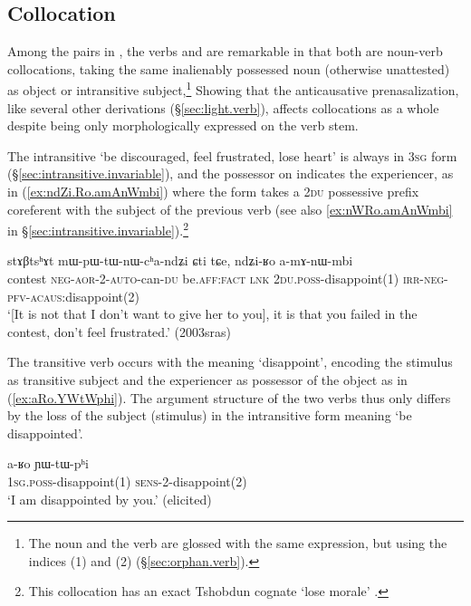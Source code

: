\subsection{Collocation} \label{sec:anticausative.collocation}
Among the pairs in , the verbs  and  are remarkable in that both are noun-verb collocations, taking the same inalienably possessed noun  (otherwise unattested) as object or intransitive subject,\footnote{The noun and the verb are glossed with the same expression, but using the indices (1) and (2) (§\ref{sec:orphan.verb}).   } Showing that the anticausative prenasalization, like several other derivations (§\ref{sec:light.verb}), affects collocations as a whole despite being only morphologically expressed on the verb stem.

The intransitive  `be discouraged, feel frustrated, lose heart' is always in \textsc{3sg} form (§\ref{sec:intransitive.invariable}), and the possessor on  indicates the experiencer, as in (\ref{ex:ndZi.Ro.amAnWmbi}) where the form  takes a \textsc{2du} possessive prefix coreferent with the subject of the previous verb (see also \ref{ex:nWRo.amAnWmbi} in §\ref{sec:intransitive.invariable}).\footnote{This collocation has an exact Tshobdun cognate  `lose morale' \citep[708]{jackson19tshobdun}. }

\begin{exe}
\ex \label{ex:ndZi.Ro.amAnWmbi}
\gll stɤβtsʰɤt mɯ-pɯ-tɯ-nɯ-cʰa-ndʑi ɕti tɕe, ndʑi-ʁo a-mɤ-nɯ-mbi  \\
contest \textsc{neg}-\textsc{aor}-2-\textsc{auto}-can-\textsc{du} be.\textsc{aff}:\textsc{fact} \textsc{lnk} \textsc{2du}.\textsc{poss}-disappoint(1) \textsc{irr}-\textsc{neg}-\textsc{pfv}-\textsc{acaus}:disappoint(2) \\
\glt `[It is not that I don't want to give her to you], it is that you failed in the contest, don't feel frustrated.' (2003sras)
\end{exe}

The transitive verb  occurs with the meaning `disappoint', encoding the stimulus as transitive subject and the experiencer as possessor of the object as in (\ref{ex:aRo.YWtWphi}). The argument structure of the two verbs thus only differs by the loss of the subject (stimulus) in the intransitive form  meaning `be disappointed'.

\begin{exe}
\ex \label{ex:aRo.YWtWphi}
\gll a-ʁo ɲɯ-tɯ-pʰi \\
 \textsc{1sg}.\textsc{poss}-disappoint(1) \textsc{sens}-2-disappoint(2) \\
 \glt `I am disappointed by you.' (elicited)
\end{exe}

